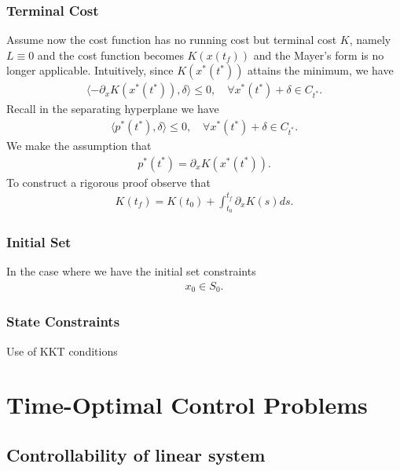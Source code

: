 \subsubsection{Terminal Cost}
Assume now the cost function has no running cost but terminal cost $K$, namely $L \equiv 0$ and the cost function becomes $K(x(t_f))$ and the Mayer's form is no longer applicable. Intuitively, since $K(x^*(t^*))$ attains the minimum, we have
\begin{align*}
	\langle -\partial_x K(x^*(t^*)) , \delta \rangle \le 0, \quad \forall x^*(t^*) + \delta \in C_{t^*}. 
\end{align*}
Recall in the separating hyperplane we have
\begin{align*}
	\langle p^*(t^*), \delta \rangle \le 0, \quad \forall x^*(t^*) + \delta \in C_{t^*}. 
\end{align*}
We make the assumption that 
\begin{align*}
	p^*(t^*) = \partial_x K(x^*(t^*)). 
\end{align*}
To construct a rigorous proof observe that
\begin{align*}
	K(t_f) = K(t_0) + \int_{t_0}^{t_f} \partial_x K (s) ds. 
\end{align*}


\subsubsection{Initial Set}
In the case where we have the initial set constraints 
\begin{align*}
	x_0 \in S_0. 
\end{align*}

\subsubsection{State Constraints}
Use of KKT conditions



\section{Time-Optimal Control Problems}
\subsection{Controllability of linear system}
